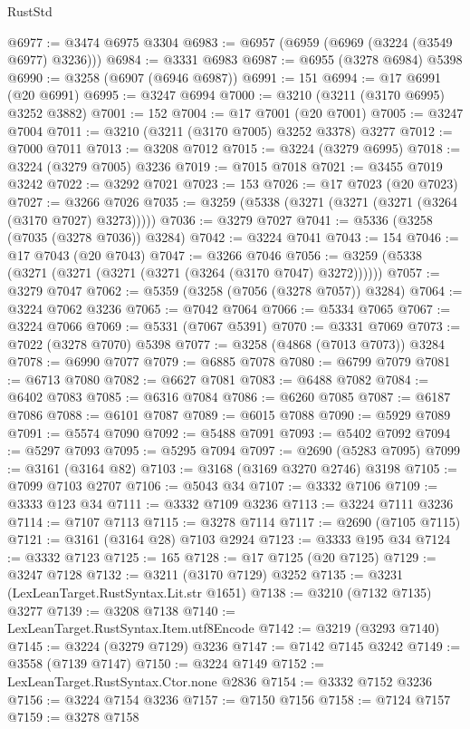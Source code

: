 \begin{lexlean}{RustStd}
\begin{coremodule}
@6977 := @3474 @6975 @3304
@6983 := @6957 (@6959 (@6969 (@3224 (@3549 @6977) @3236)))
@6984 := @3331 @6983
@6987 := @6955 (@3278 @6984) @5398
@6990 := @3258 (@6907 (@6946 @6987))
@6991 := 151
@6994 := @17 @6991 (@20 @6991)
@6995 := @3247 @6994
@7000 := @3210 (@3211 (@3170 @6995) @3252 @3882)
@7001 := 152
@7004 := @17 @7001 (@20 @7001)
@7005 := @3247 @7004
@7011 := @3210 (@3211 (@3170 @7005) @3252 @3378) @3277
@7012 := @7000 @7011
@7013 := @3208 @7012
@7015 := @3224 (@3279 @6995)
@7018 := @3224 (@3279 @7005) @3236
@7019 := @7015 @7018
@7021 := @3455 @7019 @3242
@7022 := @3292 @7021
@7023 := 153
@7026 := @17 @7023 (@20 @7023)
@7027 := @3266 @7026
@7035 := @3259 (@5338 (@3271 (@3271 (@3271 (@3264 (@3170 @7027) @3273)))))
@7036 := @3279 @7027
@7041 := @5336 (@3258 (@7035 (@3278 @7036)) @3284)
@7042 := @3224 @7041
@7043 := 154
@7046 := @17 @7043 (@20 @7043)
@7047 := @3266 @7046
@7056 := @3259 (@5338 (@3271 (@3271 (@3271 (@3271 (@3264 (@3170 @7047) @3272))))))
@7057 := @3279 @7047
@7062 := @5359 (@3258 (@7056 (@3278 @7057)) @3284)
@7064 := @3224 @7062 @3236
@7065 := @7042 @7064
@7066 := @5334 @7065
@7067 := @3224 @7066
@7069 := @5331 (@7067 @5391)
@7070 := @3331 @7069
@7073 := @7022 (@3278 @7070) @5398
@7077 := @3258 (@4868 (@7013 @7073)) @3284
@7078 := @6990 @7077
@7079 := @6885 @7078
@7080 := @6799 @7079
@7081 := @6713 @7080
@7082 := @6627 @7081
@7083 := @6488 @7082
@7084 := @6402 @7083
@7085 := @6316 @7084
@7086 := @6260 @7085
@7087 := @6187 @7086
@7088 := @6101 @7087
@7089 := @6015 @7088
@7090 := @5929 @7089
@7091 := @5574 @7090
@7092 := @5488 @7091
@7093 := @5402 @7092
@7094 := @5297 @7093
@7095 := @5295 @7094
@7097 := @2690 (@5283 @7095)
@7099 := @3161 (@3164 @82)
@7103 := @3168 (@3169 @3270 @2746) @3198
@7105 := @7099 @7103 @2707
@7106 := @5043 @34
@7107 := @3332 @7106
@7109 := @3333 @123 @34
@7111 := @3332 @7109 @3236
@7113 := @3224 @7111 @3236
@7114 := @7107 @7113
@7115 := @3278 @7114
@7117 := @2690 (@7105 @7115)
@7121 := @3161 (@3164 @28) @7103 @2924
@7123 := @3333 @195 @34
@7124 := @3332 @7123
@7125 := 165
@7128 := @17 @7125 (@20 @7125)
@7129 := @3247 @7128
@7132 := @3211 (@3170 @7129) @3252
@7135 := @3231 (LexLeanTarget.RustSyntax.Lit.str @1651)
@7138 := @3210 (@7132 @7135) @3277
@7139 := @3208 @7138
@7140 := LexLeanTarget.RustSyntax.Item.utf8Encode
@7142 := @3219 (@3293 @7140)
@7145 := @3224 (@3279 @7129) @3236
@7147 := @7142 @7145 @3242
@7149 := @3558 (@7139 @7147)
@7150 := @3224 @7149
@7152 := LexLeanTarget.RustSyntax.Ctor.none @2836
@7154 := @3332 @7152 @3236
@7156 := @3224 @7154 @3236
@7157 := @7150 @7156
@7158 := @7124 @7157
@7159 := @3278 @7158

\end{coremodule}
\end{lexlean}

